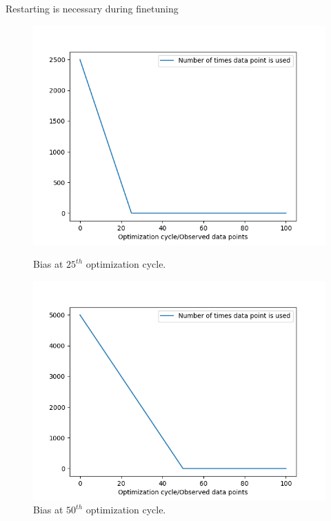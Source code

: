\documentclass{beamer}
\begin{document}
\begin{frame}[t]{Restarting is necessary during finetuning}
\begin{figure}[h]%
\centering
\begin{minipage}{0.45\textwidth}
\includegraphics[width=\textwidth]{images/bias25}
\caption{Bias at $25^{th}$ optimization cycle.}
    \label{fig:bias25}
\end{minipage}\hfill
\begin{minipage}{0.45\textwidth}
\includegraphics[width=\textwidth]{images/bias50}
\caption{Bias at $50^{th}$ optimization cycle.}
    \label{fig:bias50}
\end{minipage}\par
\end{figure}

\end{frame}
\end{document}
